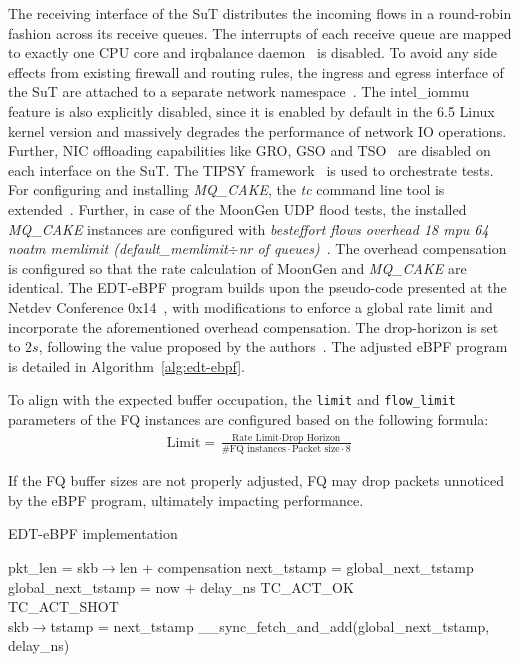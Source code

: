 The receiving interface of the SuT distributes the incoming flows in a round-robin fashion across its receive queues.
%
The interrupts of each receive queue are mapped to exactly one CPU core and irqbalance daemon~\cite{irqbalance} is disabled.
%
To avoid any side effects from existing firewall and routing rules, the ingress and egress interface of the SuT are attached to a separate network namespace~\cite{network-namespace}.
%
The intel\_iommu~\cite{iommu} feature is also explicitly disabled, since it is enabled by default in the 6.5 Linux kernel version and massively degrades the performance of network IO operations.
%
Further, NIC offloading capabilities like GRO, GSO and TSO~\cite{offloads} are disabled on each interface on the SuT.
%
The TIPSY framework~\cite{tipsy} is used to orchestrate tests.
%
For configuring and installing \textit{MQ\_CAKE}, the \textit{tc} command line tool is extended~\cite{mq-cake-iproute}.
%
Further, in case of the MoonGen UDP flood tests, the installed \textit{MQ\_CAKE} instances are configured with \textit{besteffort flows overhead 18 mpu 64 noatm memlimit (default\_memlimit$\div$nr of queues)}~\cite{cake-manual}.
%
The overhead compensation is configured so that the rate calculation of MoonGen and \textit{MQ\_CAKE} are identical.
%
The EDT-eBPF program builds upon the pseudo-code presented at the Netdev Conference 0x14~\cite{edt-ebpf}, with modifications to enforce a global rate limit and incorporate the aforementioned overhead compensation.
%
The drop-horizon is set to $2s$, following the value proposed by the authors~\cite{edt-ebpf}. The adjusted eBPF program is detailed in Algorithm~\ref{alg:edt-ebpf}.

To align with the expected buffer occupation, the \lstinline{limit} and \lstinline{flow_limit} parameters of the FQ instances are configured based on the following formula:
\begin{align*}
    \text{Limit} = \frac{\text{Rate Limit}\cdot \text{Drop Horizon}}{\text{\# FQ instances}\cdot \text{Packet size} \cdot 8}
\end{align*}

If the FQ buffer sizes are not properly adjusted, FQ may drop packets unnoticed by the eBPF program, ultimately impacting performance.

\begin{algorithm}[h]
    \caption{EDT-eBPF implementation}\label{alg:edt-ebpf}
\begin{algorithmic}[1]
    \State pkt\_len = skb$\rightarrow$len + compensation
    \State next\_tstamp = global\_next\_tstamp
    \\
        \State global\_next\_tstamp = now + delay\_ns
        \State \Return TC\_ACT\_OK
    \EndIf
    \\
        \State \Return TC\_ACT\_SHOT
    \EndIf
    \\
    \State skb$\rightarrow$tstamp = next\_tstamp
    \State \_\_sync\_fetch\_and\_add(global\_next\_tstamp, delay\_ns)
\EndProcedure
\end{algorithmic}
\end{algorithm}

